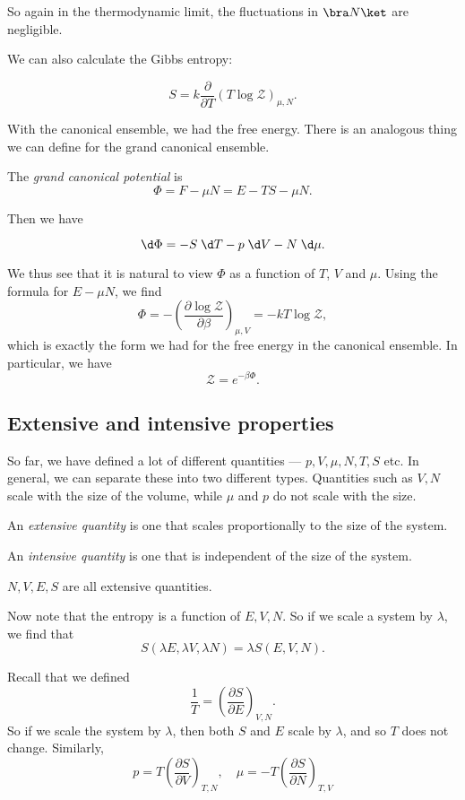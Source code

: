 \documentclass[a4paper]{article}
\begin{document}
So again in the thermodynamic limit, the fluctuations in $\bra N\ket$ are negligible.

We can also calculate the Gibbs entropy:
\begin{prop}
  \[
    S = k \frac{\partial}{\partial T}(T \log \mathcal{Z})_{\mu, N}.
  \]
\end{prop}

With the canonical ensemble, we had the free energy. There is an analogous thing we can define for the grand canonical ensemble.
\begin{defi}\index{$\Phi$}
  The \emph{grand canonical potential} is
  \[
    \Phi = F - \mu N = E - TS - \mu N.
  \]
\end{defi}
Then we have
\begin{prop}
  \[
    \d \Phi = - S \;\d T - p \;\d V - N \;\d \mu.
  \]
\end{prop}
We thus see that it is natural to view $\Phi$ as a function of $T$, $V$ and $\mu$. Using the formula for $E - \mu N$, we find
\[
  \Phi = - \left(\frac{\partial \log \mathcal{Z}}{ \partial \beta}\right)_{\mu, V} = -kT \log \mathcal{Z},
\]
which is exactly the form we had for the free energy in the canonical ensemble. In particular, we have
\[
  \mathcal{Z} = e^{-\beta \Phi}.
\]
\subsection{Extensive and intensive properties}
So far, we have defined a lot of different quantities --- $p, V, \mu, N, T, S$ etc. In general, we can separate these into two different types. Quantities such as $V, N$ scale with the size of the volume, while $\mu$ and $p$ do not scale with the size.

\begin{defi}
  An \emph{extensive quantity} is one that scales proportionally to the size of the system.
\end{defi}

\begin{defi}
  An \emph{intensive quantity} is one that is independent of the size of the system.
\end{defi}

\begin{eg}
  $N, V, E, S$ are all extensive quantities.
\end{eg}

Now note that the entropy is a function of $E, V, N$. So if we scale a system by $\lambda$, we find that
\[
  S(\lambda E, \lambda V, \lambda N) = \lambda S(E, V, N).
\]
\begin{eg}
  Recall that we defined
  \[
    \frac{1}{T} = \left(\frac{\partial S}{\partial E}\right)_{V, N}.
  \]
  So if we scale the system by $\lambda$, then both $S$ and $E$ scale by $\lambda$, and so $T$ does not change. Similarly,
  \[
    p = T \left(\frac{\partial S}{\partial V}\right)_{T, N},\quad \mu = -T \left(\frac{\partial S}{\partial N}\right)_{T, V}
  \]
\end{eg}
\end{document}
